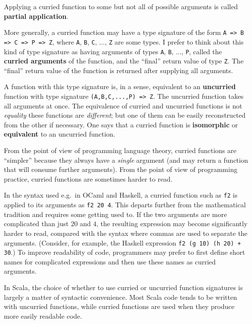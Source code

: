 Applying a curried function to some but not all of possible arguments
is called \textbf{partial application}.

More generally, a curried function may have a type signature of the
form \lstinline!A => B => C => P => Z!, where \lstinline!A!, \lstinline!B!,
\lstinline!C!, ..., \lstinline!Z! are some types. I prefer to think
about this kind of type signature as having arguments of types \lstinline!A!,
\lstinline!B!, ..., \lstinline!P!, called the \textbf{curried
arguments} of the function, and the ``final'' return value of type
\lstinline!Z!. The ``final'' return value of the function is returned
after supplying all arguments.

A function with this type signature is, in a sense, equivalent to
an \textbf{uncurried} function with type
signature \lstinline!(A,B,C,...,P) => Z!. The uncurried function
takes all arguments at once. The equivalence of curried and uncurried
functions is not \emph{equality}  \textendash{}  these functions are
\emph{different}; but one of them can be easily reconstructed from
the other if necessary. One says that a curried function is \textbf{isomorphic}
or \textbf{equivalent} to an uncurried function.

From the point of view of programming language theory, curried functions
are ``simpler'' because they always have a \emph{single} argument
(and may return a function that will consume further arguments). From
the point of view of programming practice, curried functions are sometimes
harder to read.

In the syntax used e.g.\ in OCaml and Haskell, a curried function
such as \lstinline!f2! is applied to its arguments as \lstinline!f2 20 4!.
This departs further from the mathematical tradition and requires
some getting used to. If the two arguments are more complicated than
just $20$ and $4$, the resulting expression may become significantly
harder to read, compared with the syntax where commas are used to
separate the arguments. (Consider, for example, the Haskell expression
\lstinline!f2 (g 10) (h 20) + 30!.) To improve readability of code,
programmers may prefer to first define short names for complicated
expressions and then use these names as curried arguments.

In Scala, the choice of whether to use curried or uncurried function
signatures is largely a matter of syntactic convenience. Most Scala
code tends to be written with uncurried functions, while curried functions
are used when they produce more easily readable code.

